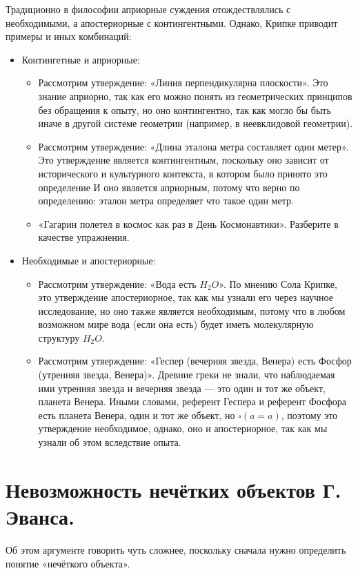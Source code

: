 \documentclass[openany]{book}
\theoremstyle{plain}
\theoremstyle{definition}
\begin{document}
Традиционно в философии априорные суждения отождествлялись с необходимыми, а апостериорные с контингентными.
Однако, Крипке приводит примеры и иных комбинаций:
\begin{itemize}
\item Контингетные и априорные:
	\begin{itemize}
		\item Рассмотрим утверждение: «Линия перпендикулярна плоскости». Это знание априорно, так как его можно понять из геометрических принципов без обращения к опыту, но оно контингентно, так как могло бы быть иначе в другой системе геометрии (например, в неевклидовой геометрии).
		\item Рассмотрим утверждение: «Длина эталона метра составляет один метер». Это утверждение является контингентным, поскольку оно зависит от исторического и культурного контекста, в котором было принято это определение И оно является априорным, потому что верно по определению: эталон метра определяет что такое один метр.
		\item «Гагарин полетел в космос как раз в День Космонавтики». Разберите в качестве упражнения.
	\end{itemize}
\item Необходимые и апостериорные:
	\begin{itemize}
		\item Рассмотрим утверждение: «Вода есть \(H_2 O\)». По мнению Сола Крипке, это утверждение апостериорное, так как мы узнали его через научное исследование, но оно также является необходимым, потому что в любом возможном мире вода (если она есть) будет иметь молекулярную структуру \(H_2 O\).
		\item Рассмотрим утверждение: «Геспер (вечерняя звезда, Венера) есть Фосфор (утренняя звезда, Венера)». Древние греки не знали, что наблюдаемая ими утренняя звезда и вечерняя звезда — это один и тот же объект, планета Венера. Иными словами, референт Геспера и референт Фосфора есть планета Венера, один и тот же объект, но \(\square(a = a)\), поэтому это утверждение необходимое, однако, оно и апостериорное, так как мы узнали об этом вследствие опыта.
	\end{itemize}
\end{itemize}


\section{Невозможность нечётких объектов Г. Эванса.}

Об этом аргументе говорить чуть сложнее, поскольку сначала нужно определить понятие «нечёткого объекта».
\end{document}
